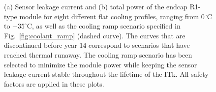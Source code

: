 \begin{figure}[ht]
\centering
{}\quad\quad
{}
\caption{(a) Sensor leakage current and (b) total power of the endcap R1-type module for eight different flat cooling profiles, ranging from 0$^\circ$C to $-35^\circ$C, as well as the cooling ramp scenario specified in Fig.~\ref{fig:coolant_ramp} (dashed curve). The curves that are discontinued before year 14 correspond to scenarios that have reached thermal runaway. The cooling ramp scenario has been selected to minimize the module power while keeping the sensor leakage current stable throughout the lifetime of the ITk. All safety factors are applied in these plots.}
\label{fig:rampoptimization}
\end{figure}
